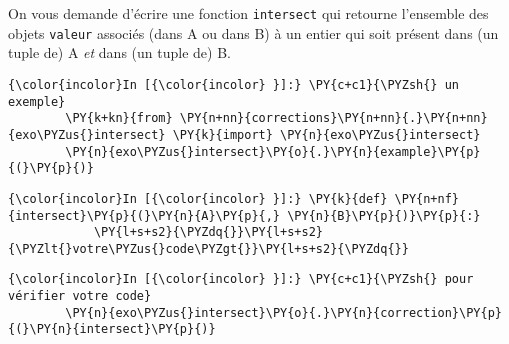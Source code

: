 On vous demande d'écrire une fonction \texttt{intersect} qui retourne
l'ensemble des objets \texttt{valeur} associés (dans A ou dans B) à un
entier qui soit présent dans (un tuple de) A \emph{et} dans (un tuple
de) B.

    \begin{Verbatim}[commandchars=\\\{\}]
{\color{incolor}In [{\color{incolor} }]:} \PY{c+c1}{\PYZsh{} un exemple}
        \PY{k+kn}{from} \PY{n+nn}{corrections}\PY{n+nn}{.}\PY{n+nn}{exo\PYZus{}intersect} \PY{k}{import} \PY{n}{exo\PYZus{}intersect}
        \PY{n}{exo\PYZus{}intersect}\PY{o}{.}\PY{n}{example}\PY{p}{(}\PY{p}{)}
\end{Verbatim}


    \begin{Verbatim}[commandchars=\\\{\}]
{\color{incolor}In [{\color{incolor} }]:} \PY{k}{def} \PY{n+nf}{intersect}\PY{p}{(}\PY{n}{A}\PY{p}{,} \PY{n}{B}\PY{p}{)}\PY{p}{:}
            \PY{l+s+s2}{\PYZdq{}}\PY{l+s+s2}{\PYZlt{}votre\PYZus{}code\PYZgt{}}\PY{l+s+s2}{\PYZdq{}}
\end{Verbatim}


    \begin{Verbatim}[commandchars=\\\{\}]
{\color{incolor}In [{\color{incolor} }]:} \PY{c+c1}{\PYZsh{} pour vérifier votre code}
        \PY{n}{exo\PYZus{}intersect}\PY{o}{.}\PY{n}{correction}\PY{p}{(}\PY{n}{intersect}\PY{p}{)}
\end{Verbatim}